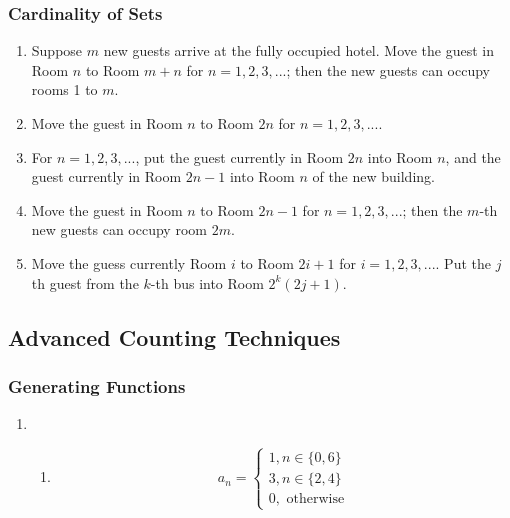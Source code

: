 \documentclass{sig-alternate-05-2015}
\begin{document}
\subsubsection{Cardinality of Sets}
\begin{enumerate}
\item Suppose $m$
new guests arrive at the fully occupied hotel. Move the guest
in Room $n$ to Room $m + n$ for $n = 1, 2, 3, ...$; then the new
guests can occupy rooms 1 to $m$.
\item Move the guest
in Room $n$ to Room $2n$ for $n = 1, 2, 3, ...$.
\item For $n = 1, 2, 3, ...$, put the guest currently in Room $2n$ into Room $n$, and the guest
currently in Room $2n - 1$ into Room $n$ of the new building.
\item Move the guest
in Room $n$ to Room $2n - 1$ for $n = 1, 2, 3, ...$; then the $m$-th new guests can occupy room $2m$.
\item Move the guess currently Room $i$ to Room $2i + 1$ for $i = 1, 2, 3, ...$. Put the $j$ th guest from the $k$-th bus into
Room $2^k(2j + 1)$.
\end{enumerate}

\subsection{Advanced Counting Techniques}
\subsubsection{Generating Functions}
\begin{enumerate}
	\item \begin{enumerate}
		\item \begin{equation}
			a_n = \begin{cases}
				1, n \in \{0, 6\}\\
				3, n \in \{2, 4\}\\
				0, \text{ otherwise}
			\end{cases}
		\end{equation}
	\end{enumerate}
\end{enumerate}
\end{document}
